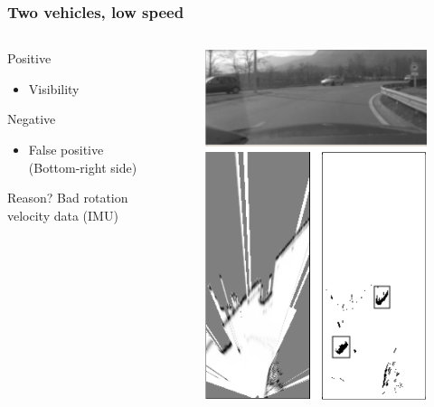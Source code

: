 \documentclass{beamer}
\begin{document}
	\begin{frame}
		\frametitle{Two vehicles, low speed}
		
		\begin{columns}[t]
			\begin{column}[t]{5cm}
				\begin{exampleblock}{Positive}
				\begin{itemize}
				\item Visibility
				\end{itemize}
				\end{exampleblock}
								
				\begin{alertblock}{Negative}
				\begin{itemize}
				\item False positive (Bottom-right side)
				\end{itemize}
				\end{alertblock}					
				
				\begin{block}{Reason?}
				Bad rotation velocity data (IMU)
				\end{block}
			\end{column}
			\begin{column}[t]{5cm}
				\begin{figure}[h]
				\center
				\includegraphics[scale=0.55]{../img/fig:result:scenetwocars}
				\end{figure}
			\end{column}
		\end{columns}		


\end{frame}
\end{document}
